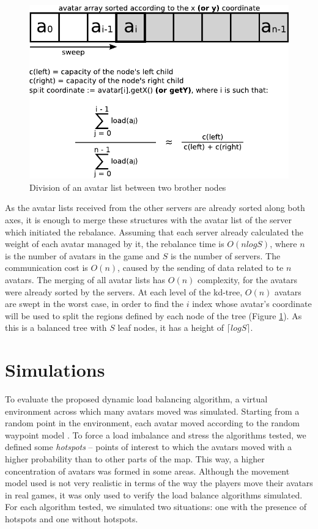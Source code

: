 \documentclass[acmtocl]{acmtrans2m}
\begin{document}
\begin{figure}
  \centering
  \includegraphics[width=0.9\linewidth]{images/balancenode}
  \caption{Division of an avatar list between two brother nodes}
   \label{fig:balancenode}
\end{figure}

As the avatar lists received from the other servers are already sorted along both axes, it is enough to merge these structures with the avatar list of the server which initiated the rebalance. Assuming that each server already calculated the weight of each avatar managed by it, the rebalance time is  $O(nlogS)$, where $n$ is the number of avatars in the game and $S$ is the number of servers. The communication cost is $O(n)$, caused by the sending of data related to te $n$ avatars. The merging of all avatar lists has $O(n)$ complexity, for the avatars were already sorted by the servers. At each level of the kd-tree, $O(n)$ avatars are swept in the worst case, in order to find the $i$ index whose avatar's coordinate will be used to split the regions defined by each node of the tree (Figure \ref{fig:balancenode}). As this is a balanced tree with $S$ leaf nodes, it has a height of $\lceil logS \rceil$.

\section{Simulations}
\label{sec:simul}

To evaluate the proposed dynamic load balancing algorithm, a virtual environment across which many avatars moved was simulated. Starting from a random point in the environment, each avatar moved according to the random waypoint model \cite{bettstetter2004spr}. To force a load imbalance and stress the algorithms tested, we defined some \emph{hotspots} -- points of interest to which the avatars moved with a higher probability than to other parts of the map. This way, a higher concentration of avatars was formed in some areas. Although the movement model used is not very realistic in terms of the way the players move their avatars in real games, it was only used to verify the load balance algorithms simulated. For each algorithm tested, we simulated two situations: one with the presence of hotspots and one without hotspots.
\end{document}
